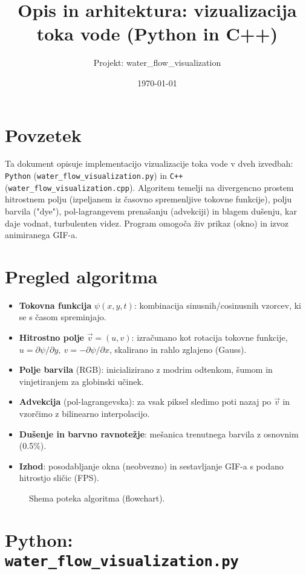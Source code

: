 \documentclass[11pt,a4paper]{article}
\title{Opis in arhitektura: vizualizacija toka vode (Python in C++)}
\author{Projekt: water\_flow\_visualization}
\date{\today}
\begin{document}
\maketitle

\section*{Povzetek}
Ta dokument opisuje implementacijo vizualizacije toka vode v dveh izvedbah: \texttt{Python} (\texttt{water\_flow\_visualization.py}) in \texttt{C++} (\texttt{water\_flow\_visualization.cpp}). Algoritem temelji na divergencno prostem hitrostnem polju (izpeljanem iz časovno spremenljive tokovne funkcije), polju barvila ("dye"), pol-lagrangevem prenašanju (advekciji) in blagem dušenju, kar daje vodnat, turbulenten videz. Program omogoča živ prikaz (okno) in izvoz animiranega GIF-a.

\section{Pregled algoritma}
\begin{itemize}[noitemsep]
  \item \textbf{Tokovna funkcija} \(\psi(x,y,t)\): kombinacija sinusnih/cosinusnih vzorcev, ki se s časom spreminjajo.
  \item \textbf{Hitrostno polje} \(\vec v = (u,v)\): izračunano kot rotacija tokovne funkcije, \(u = \partial\psi/\partial y,\ v = -\partial\psi/\partial x\), skalirano in rahlo zglajeno (Gauss).
  \item \textbf{Polje barvila} (RGB): inicializirano z modrim odtenkom, šumom in vinjetiranjem za globinski učinek.
  \item \textbf{Advekcija} (pol-lagrangevska): za vsak piksel sledimo poti nazaj po \(\vec v\) in vzorčimo z bilinearno interpolacijo.
  \item \textbf{Dušenje in barvno ravnotežje}: mešanica trenutnega barvila z osnovnim (0.5\%).
  \item \textbf{Izhod}: posodabljanje okna (neobvezno) in sestavljanje GIF-a s podano hitrostjo sličic (FPS).
\end{itemize}

\begin{figure}[H]
  \centering
  
  \caption{Shema poteka algoritma (flowchart).}
\end{figure}

\section{Python: \texttt{water\_flow\_visualization.py}}
\end{document}
